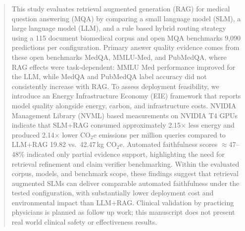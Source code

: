 \begin{abstract}
    This study evaluates retrieval augmented generation (RAG) for medical question answering (MQA) by comparing a small language model (SLM), a large language model (LLM), and a rule based hybrid routing strategy using a 115 document biomedical corpus and open MQA benchmarks 9,090 predictions per configuration. Primary answer quality evidence comes from these open benchmarks MedQA, MMLU-Med, and PubMedQA, where RAG effects were task-dependent: MMLU Med performance improved for the LLM, while MedQA and PubMedQA label accuracy did not consistently increase with RAG. To assess deployment feasibility, we introduce an Energy Infrastructure Economy (EIE) framework that reports model quality alongside energy, carbon, and infrastructure costs. NVIDIA Management Library (NVML) based measurements on NVIDIA T4 GPUs indicate that SLM+RAG consumed approximately 2.15$\times$ less energy and produced 2.14$\times$ lower CO$_2$e emissions per million queries compared to LLM+RAG 19.82 vs.\ 42.47\,kg CO$_2$e. Automated faithfulness scores $\approx$47--48\% indicated only partial evidence support, highlighting the need for retrieval refinement and claim verifier benchmarking. Within the evaluated corpus, models, and benchmark scope, these findings suggest that retrieval augmented SLMs can deliver comparable automated faithfulness under the tested configuration, with substantially lower deployment cost and environmental impact than LLM+RAG. Clinical validation by practicing physicians is planned as follow up work; this manuscript does not present real world clinical safety or effectiveness results.
\end{abstract}
